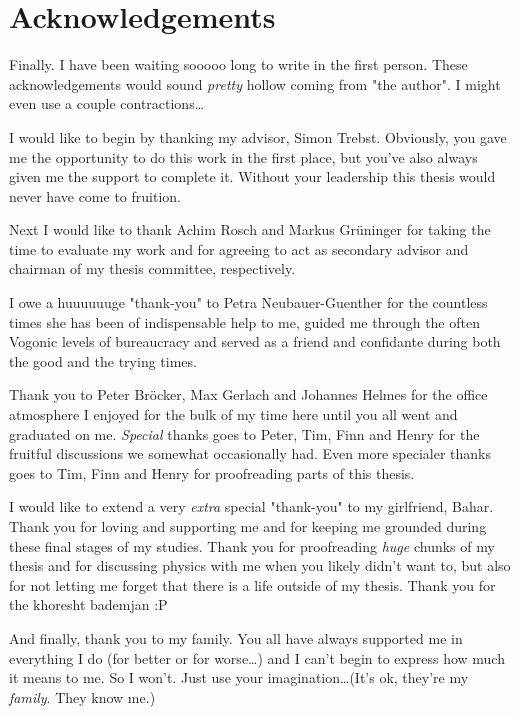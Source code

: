 \chapter*{Acknowledgements}
%
%
%
Finally.
I have been waiting sooooo long to write in the first person.
These acknowledgements would sound \textit{pretty} hollow coming from "the author".
I might even use a couple contractions\ldots

I would like to begin by thanking my advisor, Simon Trebst.
Obviously, you gave me the opportunity to do this work in the first place, but you've also always given me the support to complete it.
Without your leadership this thesis would never have come to fruition.

Next I would like to thank Achim Rosch and Markus Gr\"uninger for taking the time to evaluate my work and for agreeing to act as secondary advisor and chairman of my thesis committee, respectively.

I owe a huuuuuuge "thank-you" to Petra Neubauer-Guenther for the countless times she has been of indispensable help to me, guided me through the often Vogonic levels of bureaucracy and served as a friend and confidante during both the good and the trying times.

Thank you to Peter Br\"ocker, Max Gerlach and Johannes Helmes for the office atmosphere I enjoyed for the bulk of my time here until you all went and graduated on me.
\textit{Special} thanks goes to Peter, Tim, Finn and Henry for the fruitful discussions we somewhat occasionally had.
Even more specialer thanks goes to Tim, Finn and Henry for proofreading parts of this thesis.

I would like to extend a very \textit{extra} special "thank-you" to my girlfriend, Bahar.
Thank you for loving and supporting me and for keeping me grounded during these final stages of my studies.
Thank you for proofreading \textit{huge} chunks of my thesis and for discussing physics with me when you likely didn't want to, but also for not letting me forget that there is a life outside of my thesis.
Thank you for the khoresht bademjan :P

And finally, thank you to my family.
You all have always supported me in everything I do (for better or for worse\ldots) and I can't begin to express how much it means to me.
So I won't.
Just use your imagination\ldots (It's ok, they're my \textit{family}. They know me.)